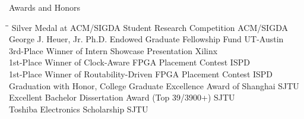 
\begin{rSection}{Awards and Honors}
\begin{tabbing}
\hspace{4.55in}\= \hspace{1.95in}\= \kill
Silver Medal at ACM/SIGDA Student Research Competition \> ACM/SIGDA  \\
George J. Heuer, Jr. Ph.D. Endowed Graduate Fellowship Fund \> UT-Austin  \\
3rd-Place Winner of Intern Showcase Presentation \> Xilinx  \\
1st-Place Winner of Clock-Aware FPGA Placement Contest \> ISPD  \\
1st-Place Winner of Routability-Driven FPGA Placement Contest \> ISPD  \\
Graduation with Honor, College Graduate Excellence Award of Shanghai \> SJTU  \\
Excellent Bachelor Dissertation Award (Top 39/3900+) \> SJTU  \\
Toshiba Electronics Scholarship \> SJTU  \\

\end{tabbing}
\end{rSection}


